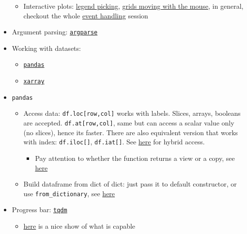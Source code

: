 \documentclass[a4paper,12pt,%
              final%
              ]{article}
\begin{document}
\begin{itemize}
\begin{itemize}
      \item Interactive plots: \href{https://matplotlib.org/stable/gallery/event_handling/legend_picking.html}{legend picking}, \href{https://matplotlib.org/stable/gallery/event_handling/cursor_demo.html}{grids moving with the mouse}, in general, checkout the whole \href{https://matplotlib.org/stable/gallery/event_handling/index.html}{event handling} session
    \end{itemize}
  \item Argument parsing: \href{https://docs.python.org/3/library/argparse.html#module-argparse}{\texttt{argparse}}
  \item Working with datasets:
    \begin{itemize}
      \item \href{https://pandas.pydata.org/docs/user_guide/10min.html}{\texttt{pandas}}
      \item \href{http://xarray.pydata.org/en/stable/user-guide/index.html}{\texttt{xarray}}
    \end{itemize}
  \item \texttt{pandas}
    \begin{itemize}
      \item Access data: \verb|df.loc[row,col]| works with labels. Slices, arrays, booleans are accepted. \verb|df.at[row,col]|, same but can access a scalar value only (no slices), hence its faster. There are also equivalent version that works with index: \verb|df.iloc[]|, \verb|df.iat[]|. See \href{https://stackoverflow.com/questions/28754603/indexing-pandas-data-frames-integer-rows-named-columns}{here} for hybrid access.
        \begin{itemize}
          \item Pay attention to whether the function returns a view or a copy, see \href{https://pandas.pydata.org/pandas-docs/stable/user_guide/indexing.html#indexing-view-versus-copy}{here}
        \end{itemize}
      \item Build dataframe from dict of dict: just pass it to default constructor, or use \verb|from_dictionary|, see \href{https://stackoverflow.com/questions/33157522/create-pandas-dataframe-from-dictionary-of-dictionaries}{here}
    \end{itemize}
  \item Progress bar: \href{https://github.com/tqdm/tqdm#manual}{\texttt{tqdm}}
    \begin{itemize}
      \item \href{https://www.analyticsvidhya.com/blog/2021/05/how-to-use-progress-bars-in-python/}{here} is a nice show of what is capable

\end{itemize}
\end{itemize}
\end{document}
